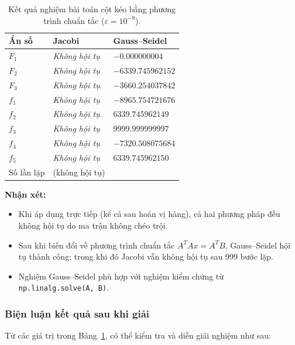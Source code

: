 \documentclass[12pt,a4paper]{article}
\begin{document}
\begin{table}[H]
\centering
\caption{Kết quả nghiệm bài toán cột kéo bằng phương trình chuẩn tắc ($\varepsilon=10^{-9}$).}
\label{tab:cotkeo}
\begin{tabular}{
  l
  >{\centering\arraybackslash}p{}
  >{\raggedleft\arraybackslash}p{}
}
\toprule
\textbf{Ẩn số} & \textbf{Jacobi} & \textbf{Gauss--Seidel} \\
\midrule
$F_1$ & \textit{Không hội tụ} & $-0.000000004$ \\
$F_2$ & \textit{Không hội tụ} & $-6339.745962152$ \\
$F_3$ & \textit{Không hội tụ} & $-3660.254037842$ \\
$f_1$ & \textit{Không hội tụ} & $-8965.754721676$ \\
$f_2$ & \textit{Không hội tụ} & $6339.745962149$ \\
$f_3$ & \textit{Không hội tụ} & $9999.999999997$ \\
$f_4$ & \textit{Không hội tụ} & $-7320.508075684$ \\
$f_5$ & \textit{Không hội tụ} & $6339.745962150$ \\
\midrule
Số lần lặp & 999 (không hội tụ) & 198 \\
\bottomrule
\end{tabular}
\end{table}

\textbf{Nhận xét:}
\begin{itemize}
    \item Khi áp dụng trực tiếp (kể cả sau hoán vị hàng), cả hai phương pháp đều không hội tụ do ma trận không chéo trội.
    \item Sau khi biến đổi về phương trình chuẩn tắc $A^TAx=A^TB$, Gauss--Seidel hội tụ thành công; trong khi đó Jacobi vẫn không hội tụ sau 999 bước lặp.
    \item Nghiệm Gauss--Seidel phù hợp với nghiệm kiểm chứng từ \texttt{np.linalg.solve(A, B)}.
\end{itemize}

\subsubsection{Biện luận kết quả sau khi giải}

Từ các giá trị trong Bảng~\ref{tab:cotkeo}, có thể kiểm tra và diễn giải nghiệm như sau:
\end{document}
